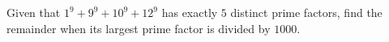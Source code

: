 Given that $1^9+9^9+10^9+12^9$ has exactly $5$ distinct prime factors, find the remainder when its largest prime factor is divided by $1000$.
